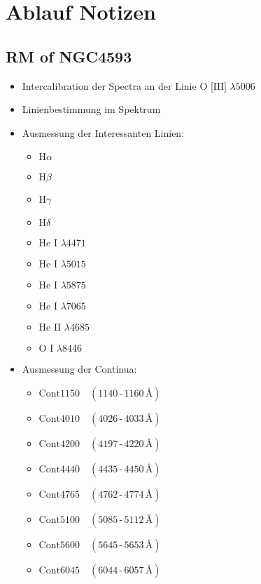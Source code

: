 \chapter{Ablauf Notizen}


\section{RM of NGC4593}
\begin{itemize}
	\item Intercalibration der Spectra an der Linie \(\text{O [III] } \lambda 5006\)
	\item Linienbestimmung im Spektrum
	\item Ausmessung der Interessanten Linien:
	\begin{itemize}
		\item \(\text{H}\alpha\)
		\item \(\text{H}\beta\)
		\item \(\text{H}\gamma\)
		\item \(\text{H}\delta\)
		\item \(\text{He I } \lambda 4471\) 
		\item \(\text{He I } \lambda 5015\) 
		\item \(\text{He I } \lambda 5875\) 
		\item \(\text{He I } \lambda 7065\) 
		\item \(\text{He II } \lambda 4685\)
		\item \(\text{O I } \lambda 8446\)  
	\end{itemize}
	\item Ausmessung der Continua:
	\begin{itemize}
		\item $\mathrm{Cont1150} \quad (1140\,\text{-}\,1160\,\text{\AA})$
		\item $\mathrm{Cont4010} \quad (4026\,\text{-}\,4033\,\text{\AA})$
		\item $\mathrm{Cont4200} \quad (4197\,\text{-}\,4220\,\text{\AA})$
		\item $\mathrm{Cont4440} \quad (4435\,\text{-}\,4450\,\text{\AA})$
		\item $\mathrm{Cont4765} \quad (4762\,\text{-}\,4774\,\text{\AA})$
		\item $\mathrm{Cont5100} \quad (5085\,\text{-}\,5112\,\text{\AA})$
		\item $\mathrm{Cont5600} \quad (5645\,\text{-}\,5653\,\text{\AA})$
		\item $\mathrm{Cont6045} \quad (6044\,\text{-}\,6057\,\text{\AA})$

\end{itemize}
\end{itemize}
